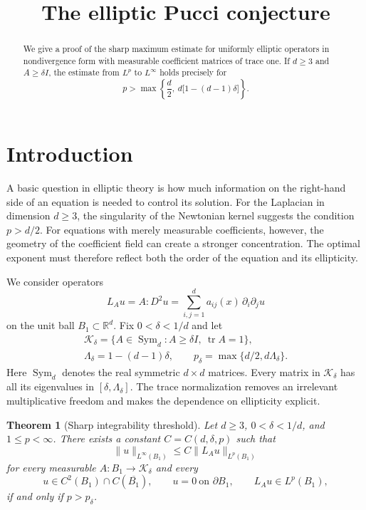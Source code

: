 \documentclass[11pt,a4paper,reqno]{amsart}
\title[The elliptic Pucci conjecture]{The elliptic Pucci conjecture}
\date{}
\theoremstyle{plain}
\newtheorem{theorem}{Theorem}[section]
\theoremstyle{remark}
\numberwithin{equation}{section}
\newcommand{\R}{\mathbb R}
\newcommand{\Kdelta}{\mathcal K_\delta}
\newcommand{\lam}{\Lambda_\delta}
\newcommand{\pcrit}{p_\delta}
\newcommand{\norm}[1]{\lVert#1\rVert}
\DeclareMathOperator{\tr}{tr}
\DeclareMathOperator{\Sym}{Sym}
\begin{document}
\begin{abstract}
We give a proof of the sharp maximum estimate for uniformly elliptic operators in nondivergence form with measurable coefficient matrices of trace one. If $d\ge3$ and $A\ge\delta I$, the estimate from $L^p$ to $L^\infty$ holds precisely for
\[
 p>\max\left\{\frac d2,\ d\bigl[1-(d-1)\delta\bigr]\right\}.
\]
\end{abstract}

\maketitle

\section{Introduction}\label{sec:introduction}
A basic question in elliptic theory is how much information on the right-hand side of an equation is needed to control its solution. For the Laplacian in dimension $d\ge3$, the singularity of the Newtonian kernel suggests the condition $p>d/2$. For equations with merely measurable coefficients, however, the geometry of the coefficient field can create a stronger concentration. The optimal exponent must therefore reflect both the order of the equation and its ellipticity.

We consider operators
\begin{equation}\label{eq:operator}
 L_Au=A:D^2u=\sum_{i,j=1}^d a_{ij}(x)\,\partial_i\partial_j u
\end{equation}
on the unit ball $B_1\subset\R^d$. Fix $0<\delta<1/d$ and let
\begin{equation}\label{eq:parameters}
 \begin{gathered}
  \Kdelta=\{A\in\Sym_d:A\ge\delta I,\ \tr A=1\},\\
  \lam=1-(d-1)\delta,\qquad
  \pcrit=\max\{d/2,d\lam\}.
 \end{gathered}
\end{equation}
Here $\Sym_d$ denotes the real symmetric $d\times d$ matrices. Every matrix in $\Kdelta$ has all its eigenvalues in $[\delta,\lam]$. The trace normalization removes an irrelevant multiplicative freedom and makes the dependence on ellipticity explicit.

\begin{theorem}[Sharp integrability threshold]\label{thm:main}
Let $d\ge3$, $0<\delta<1/d$, and $1\le p<\infty$. There exists a constant $C=C(d,\delta,p)$ such that
\begin{equation}\label{eq:main}
 \norm{u}_{L^\infty(B_1)}\le C\norm{L_Au}_{L^p(B_1)}
\end{equation}
for every measurable $A:B_1\to\Kdelta$ and every
\[
 u\in C^2(B_1)\cap C(\overline{B_1}),\qquad
 u=0\ \text{on }\partial B_1,\qquad L_Au\in L^p(B_1),
\]
if and only if $p>\pcrit$.
\end{theorem}
\end{document}
